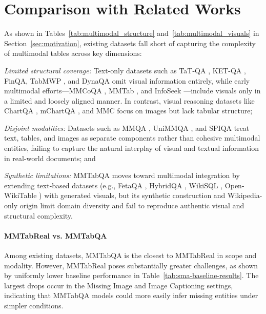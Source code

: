 \documentclass[11pt]{article}
\newcommand{\datasetName}{{\sc MMTabReal}\xspace}
\begin{document}
\section{Comparison with Related Works}
\vspace{-0.3em}
\label{sec:prior}
As shown in Tables~\ref{tab:multimodal_structure} and~\ref{tab:multimodal_visuals} in Section~\ref{sec:motivation}, existing datasets fall short of capturing the complexity of multimodal tables across key dimensions: \begin{inparaenum}[(1)]

\vspace{0.15em}
\item \emph{Limited structural coverage:} Text-only datasets such as TaT-QA \cite{zhu2021tat}, KET-QA \cite{hu-etal-2024-ket}, FinQA, TabMWP \cite{lu2023dynamicpromptlearningpolicy} \cite{chen-etal-2021-finqa}, and DynaQA \cite{lu2022dynamic} omit visual information entirely, while early multimodal efforts—MMCoQA \cite{li-etal-2022-mmcoqa}, MMTab \cite{zheng2024multimodal}, and InfoSeek \cite{Chen2023CanPV}—include visuals only in a limited and loosely aligned manner. In contrast, visual reasoning datasets like ChartQA \cite{masry2022chartqa}, mChartQA \cite{wei2024mchartqa}, and MMC \cite{liu-etal-2024-mmc} focus on images but lack tabular structure;

\vspace{0.15em}
\item \emph{Disjoint modalities:} Datasets such as MMQA \cite{talmor2021multimodalqa}, UniMMQA \cite{luo-etal-2023-unifying}, and SPIQA \cite{yvinec2023spiq} treat text, tables, and images as separate components rather than cohesive multimodal entities, failing to capture the natural interplay of visual and textual information in real-world documents; and

\vspace{0.15em}
\item \emph{Synthetic limitations:} MMTabQA \cite{mathur-etal-2024-knowledge} moves toward multimodal integration by extending text-based datasets (e.g., FetaQA \cite{nan-etal-2022-fetaqa}, HybridQA \cite{chen-etal-2020-hybridqa}, WikiSQL \cite{zhong2017seq2sql}, Open-WikiTable \cite{kweon-etal-2023-open}) with generated visuals, but its synthetic construction and Wikipedia-only origin limit domain diversity and fail to reproduce authentic visual and structural complexity.
\end{inparaenum}


\paragraph{\datasetName vs. MMTabQA}
Among existing datasets, MMTabQA is the closest to \datasetName in scope and modality. However, \datasetName poses substantially greater challenges, as shown by uniformly lower baseline performance in Table~\ref{tab:sma-baseline-results}. The largest drops occur in the Missing Image and Image Captioning settings, indicating that MMTabQA models could more easily infer missing entities under simpler conditions.
\end{document}
